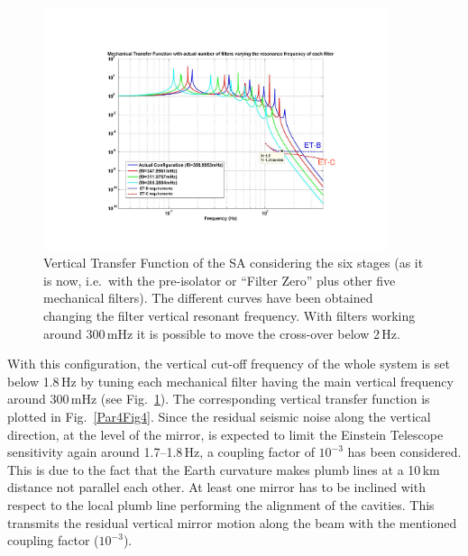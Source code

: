 \begin{figure}[t]
	\begin{center}
		\includegraphics[width=0.9\textwidth]{./Sec_Suspensions/Figures/Par4-Fig5.pdf}
			\caption{Vertical Transfer Function of the SA considering the six stages (as it is now, i.e.\ with the pre-isolator or ``Filter Zero'' plus other five mechanical filters). The different curves have been obtained changing the filter vertical resonant frequency. With filters working around 300\,mHz it is possible to move the cross-over below 2\,Hz.}
\label{Par4Fig5}
	\end{center}
\end{figure}
%
With this configuration, the vertical cut-off frequency of the whole system is set below 1.8\,Hz by tuning each mechanical filter having the main vertical frequency around 300\,mHz (see Fig.~\ref{Par4Fig5}). The corresponding vertical transfer function is plotted in Fig.~\ref{Par4Fig4}. Since the residual seismic noise along the vertical direction, at the level of the mirror, is expected to limit the Einstein Telescope sensitivity again around 1.7--1.8\,Hz, a coupling factor of $10^{-3}$ has been considered. This is due to the fact that the Earth curvature makes plumb lines at a 10\,km distance not parallel each other. At least one mirror has to be inclined with respect to the local plumb line performing the alignment of the cavities. This transmits the residual vertical mirror motion along the beam with the mentioned coupling factor ($10^{-3}$).
%
